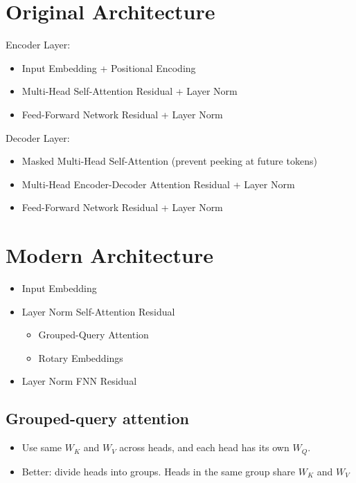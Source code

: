\section{Original Architecture}
Encoder Layer:
\begin{itemize}
    \item Input Embedding + Positional Encoding
    \item Multi-Head Self-Attention \textrightarrow{} Residual + Layer Norm
    \item Feed-Forward Network \textrightarrow{} Residual + Layer Norm
\end{itemize}
Decoder Layer:
\begin{itemize}
\item Masked Multi-Head Self-Attention (prevent peeking at future tokens)
\item Multi-Head Encoder-Decoder Attention \textrightarrow{} Residual + Layer Norm
\item Feed-Forward Network \textrightarrow{} Residual + Layer Norm
\end{itemize}

\section{Modern Architecture}
\begin{itemize}
    \item Input Embedding
    \item Layer Norm \textrightarrow{} Self-Attention \textrightarrow{} Residual
        \begin{itemize}
            \item Grouped-Query Attention
            \item Rotary Embeddings
        \end{itemize}
    \item Layer Norm \textrightarrow{} FNN \textrightarrow{} Residual
\end{itemize}

\subsection{Grouped-query attention}
\begin{itemize}
    \item Use same $W_K$ and $W_V$ across heads, and each head has its own $W_Q.$
    \item Better: divide heads into groups. Heads in the same group share $W_K$ and $W_V$
\end{itemize}

